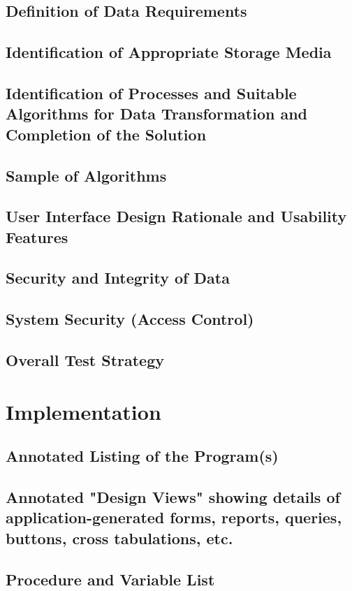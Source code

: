 \documentclass[11pt]{article}
\begin{document}
        \subsection{Definition of Data Requirements}
        \subsection{Identification of Appropriate Storage Media}
        \subsection{Identification of Processes and Suitable Algorithms for Data Transformation and Completion of the Solution}
        \subsection{Sample of Algorithms}
        \subsection{User Interface Design Rationale and Usability Features}
        \subsection{Security and Integrity of Data}
        \subsection{System Security (Access Control)}
        \subsection{Overall Test Strategy}

    \section{Implementation}
        \subsection{Annotated Listing of the Program(s)}
        \subsection{Annotated "Design Views" showing details of application-generated forms, reports, queries, buttons, cross tabulations, etc.}
        \subsection{Procedure and Variable List}
\end{document}
